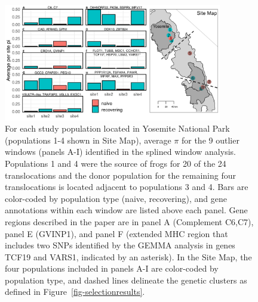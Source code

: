 \documentclass[9pt,twoside,lineno]{pnas-new-SI}
\begin{document}
\begin{figure}

{\centering \includegraphics[width=0.85\textwidth]{figures/ave_pi_per_site_yose.png}

}

\caption{\label{fig-ave-pi-per-site-yose}For each study population
located in Yosemite National Park (populations 1-4 shown in Site Map),
average \(\pi\) for the 9 outlier windows (panels A-I) identified in the
splined window analysis. Populations 1 and 4 were the source of frogs
for 20 of the 24 translocations and the donor population for the
remaining four translocations is located adjacent to populations 3 and
4. Bars are color-coded by population type (naive, recovering), and gene
annotations within each window are listed above each panel. Gene regions
described in the paper are in panel A (Complement C6,C7), panel E
(GVINP1), and panel F (extended MHC region that includes two SNPs
identified by the GEMMA analysis in genes TCF19 and VARS1, indicated by
an asterisk). In the Site Map, the four populations included in panels
A-I are color-coded by population type, and dashed lines delineate the
genetic clusters as defined in Figure~\ref{fig-selectionresults}. }

\end{figure}\clearpage

\newpage
\end{document}
